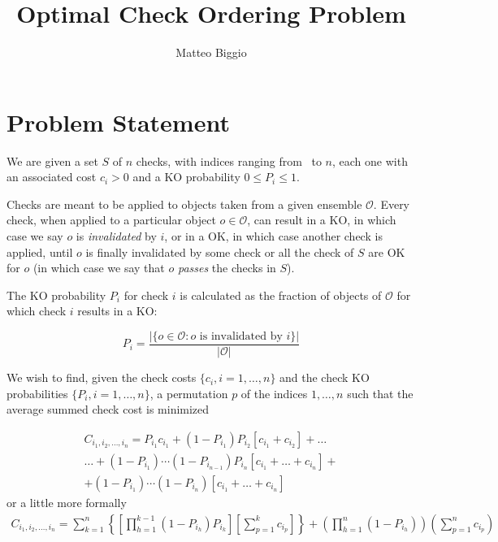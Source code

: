 \documentclass[10pt,a4paper]{article}
\begin{document}
\title{Optimal Check Ordering Problem} 
\author{Matteo Biggio} 
\maketitle 

\section{Problem Statement}

We are given a set $S$ of $n$ checks, with indices ranging from \ to $n$, each one with an associated cost $c_{i} > 0$ and a KO probability $0 \leq P_{i} \leq 1$. 

Checks are meant to be applied to objects taken from a given ensemble $\mathcal{O}$.
Every check, when applied to a particular object $o \in \mathcal{O}$, can result in a KO, in which case we say $o$ is \emph{invalidated} by $i$, or in a OK, in which case another check is applied, until $o$ is finally invalidated by some check or all the check of $S$ are OK for $o$ (in which case we say that $o$ \emph{passes} the checks in $S$).

The KO probability $P_{i}$ for check $i$ is calculated as the fraction of objects of $\mathcal{O}$ for which check $i$ results in a KO:  

\begin{equation}
	P_{i} = \frac{ | \{ o \in \mathcal{O}: o \text{ is invalidated by } i\} | }{|\mathcal{O}|}
\end{equation}

We wish to find, given the check costs $\{ c_{i}, i=1,\ldots,n \}$ and the check KO probabilities $\{ P_{i}, i=1,\ldots,n \}$, a permutation $p$ of the indices $1,\ldots,n$ such that the average summed check cost is minimized 

\begin{equation}
\begin{split}
	C_{i_{1},i_{2},\ldots,i_{n}} = P_{i_{1}}c_{i_{1}} + (1-P_{i_{1}})P_{i_{2}}\left[c_{i_{1}} + c_{i_{2}} \right] + \ldots \\
	\ldots + (1-P_{i_{1}}) \cdots (1-P_{i_{n-1}})P_{i_{n}} \left[ c_{i_{1}} + \ldots + c_{i_{n}} \right] + \\
	+ (1-P_{i_{1}}) \cdots (1-P_{i_{n}}) \left[ c_{i_{1}} + \ldots + c_{i_{n}} \right]
\end{split}
\end{equation}
or a little more formally 
\begin{equation}\label{cost}
\begin{split}
	C_{i_{1},i_{2},\ldots,i_{n}} = \sum_{k=1}^{n} \left\{ \left[\prod_{h=1}^{k-1}(1-P_{i_{h}})P_{i_{k}}\right] \left[ \sum_{p=1}^{k}c_{i_{p}} \right] \right\} + \left(\prod_{h=1}^{n}(1-P_{i_{h}})\right)\left( \sum_{p=1}^{n}c_{i_{p}} \right)
\end{split}
\end{equation}
\end{document}
